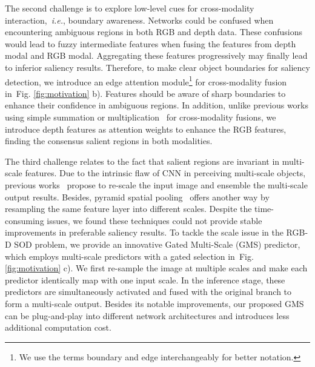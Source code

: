 \documentclass[journal]{IEEEtran}
\def\ie{{\em i.e.}}
\newcommand{\figref}[1]{Fig. \ref{#1}}
\begin{document}
The second challenge is to explore low-level cues for cross-modality interaction,~\ie, boundary awareness. Networks could be confused when encountering ambiguous regions in both RGB and depth data. These confusions would lead to fuzzy intermediate features when fusing the features from depth modal and RGB modal. Aggregating these features progressively may finally lead to inferior saliency results. Therefore, to make clear object boundaries for saliency detection, we introduce an edge attention module\footnote{We use the terms boundary and edge interchangeably for better notation.}
for cross-modality fusion in~\figref{fig:motivation} b). Features should be aware of sharp boundaries to enhance their confidence in ambiguous regions. In addition, unlike previous works using simple summation or multiplication~\cite{cheng2014depth,zhu2017innovative} for cross-modality fusions, we introduce depth features as attention weights to enhance the RGB features, finding the consensus salient regions in both modalities.

The third challenge relates to the fact that salient regions are invariant in multi-scale features. Due to the intrinsic flaw of CNN in perceiving multi-scale objects, previous works~\cite{chen2016attention} propose to re-scale the input image and ensemble the multi-scale output results. Besides, pyramid spatial pooling~\cite{zhao2017pyramid} offers another way by resampling the same feature layer into different scales. Despite the time-consuming issues, we found these techniques could not provide stable improvements in preferable saliency results.
To tackle the scale issue in the RGB-D SOD problem, we provide an innovative Gated Multi-Scale (GMS) predictor, which employs multi-scale predictors with a gated selection in~\figref{fig:motivation} c). We first re-sample the image at multiple scales and make each predictor identically map with one input scale. In the inference stage, these predictors are simultaneously activated and fused with the original branch to form a multi-scale output. Besides its notable improvements, our proposed GMS can be plug-and-play into different network architectures and introduces less additional computation cost.
\end{document}
